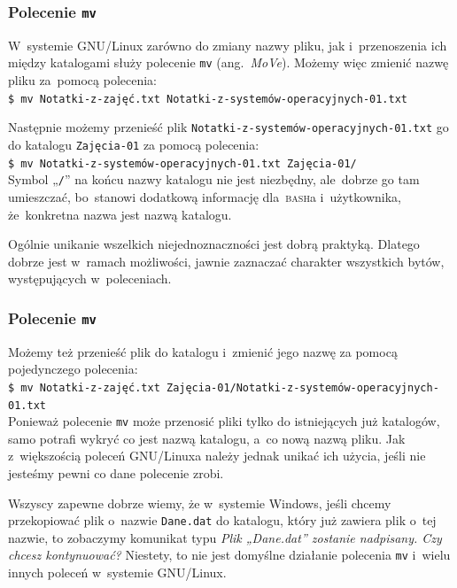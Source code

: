 \documentclass[10pt,t]{beamer}
\begin{document}
\begin{frame}
  \frametitle{Polecenie \texttt{mv}}


  W~systemie GNU/Linux zarówno do zmiany nazwy pliku, jak i~przenoszenia
  ich między katalogami służy polecenie
  {\texttt{mv}} (ang.~\textit{MoVe}). Możemy więc zmienić nazwę pliku
  za~pomocą polecenia: \\
  \texttt{\$ mv Notatki-z-zajęć.txt Notatki-z-systemów-operacyjnych-01.txt}

  Następnie możemy przenieść plik
  \texttt{Notatki-z-systemów-operacyjnych-01.txt} go do katalogu
  \texttt{Zajęcia-01} za pomocą polecenia: \\
  \texttt{\$ mv Notatki-z-systemów-operacyjnych-01.txt Zajęcia-01/} \\
  Symbol „\texttt{/}” na końcu nazwy katalogu nie jest niezbędny,
  ale~dobrze go tam umieszczać, bo~stanowi dodatkową informację
  dla~\textsc{bash}a i~użytkownika, że~konkretna nazwa jest nazwą
  katalogu.

  Ogólnie unikanie wszelkich niejednoznaczności jest dobrą praktyką.
  Dlatego dobrze jest w~ramach możliwości, jawnie zaznaczać charakter
  wszystkich bytów, występujących w~poleceniach.

\end{frame}





\begin{frame}
  \frametitle{Polecenie \texttt{mv}}


  Możemy też przenieść plik do katalogu i~zmienić jego nazwę za pomocą
  pojedynczego polecenia: \\
  \texttt{\$ mv Notatki-z-zajęć.txt
    Zajęcia-01/Notatki-z-systemów-operacyjnych-01.txt} \\
  Ponieważ polecenie \texttt{mv} może przenosić pliki tylko do istniejących
  już katalogów, samo potrafi wykryć co jest nazwą katalogu, a~co nową
  nazwą pliku. Jak z~większością poleceń GNU/Linuxa należy jednak unikać
  ich użycia, jeśli nie jesteśmy pewni co dane polecenie zrobi.

  Wszyscy zapewne dobrze wiemy, że w~systemie Windows, jeśli chcemy
  przekopiować plik o~nazwie \texttt{Dane.dat} do katalogu, który już
  zawiera plik o~tej nazwie, to zobaczymy komunikat typu
  \textit{Plik „Dane.dat” zostanie nadpisany. Czy chcesz kontynuować?}
  Niestety, to \alert{nie} jest domyślne działanie polecenia \texttt{mv}
  i~wielu innych poleceń w~systemie GNU/Linux.

\end{frame}
\end{document}
